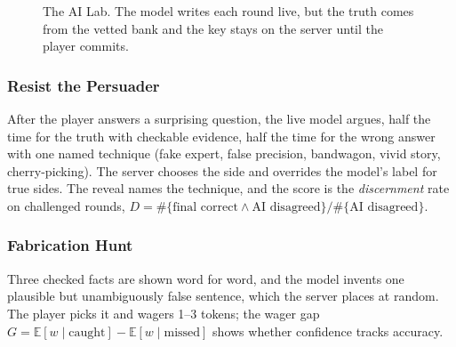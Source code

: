 \documentclass[11pt,a4paper]{article}
\begin{document}
\begin{figure}[H]
\centering
{}
\caption{The AI Lab. The model writes each round live, but the truth comes from the vetted bank and the key stays on the server until the player commits.}
\label{fig:lab}
\end{figure}

\subsubsection{Resist the Persuader} After the player answers a surprising question, the live model argues, half the time for the truth with checkable evidence, half the time for the wrong answer with one named technique (fake expert, false precision, bandwagon, vivid story, cherry-picking). The server chooses the side and overrides the model's label for true sides. The reveal names the technique, and the score is the \emph{discernment} rate on challenged rounds, $D=\#\{\text{final correct}\wedge\text{AI disagreed}\}/\#\{\text{AI disagreed}\}$.

\subsubsection{Fabrication Hunt} Three checked facts are shown word for word, and the model invents one plausible but unambiguously false sentence, which the server places at random. The player picks it and wagers 1--3 tokens; the wager gap $G=\mathbb E[w\mid\text{caught}]-\mathbb E[w\mid\text{missed}]$ shows whether confidence tracks accuracy.
\end{document}
